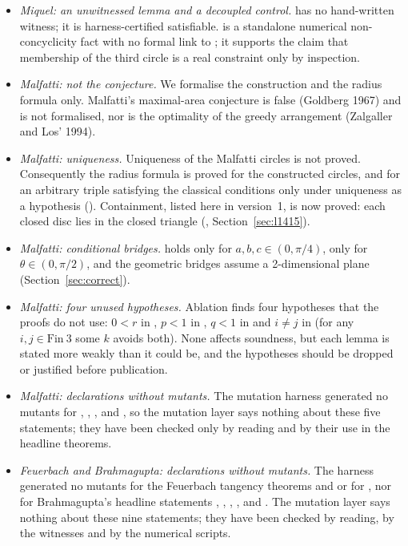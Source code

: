 \documentclass[11pt]{article}
\theoremstyle{definition}
\theoremstyle{remark}
\begin{document}
\begin{itemize}
\item \emph{Miquel: an unwitnessed lemma and a decoupled control.}  has no
hand-written witness; it is harness-certified satisfiable.  is a standalone numerical
non-concyclicity fact with no formal link to ; it supports the claim
that membership of the third circle is a real constraint only by inspection.
\item \emph{Malfatti: not the conjecture.} We formalise the construction and the radius formula
only. Malfatti's maximal-area conjecture is false (Goldberg 1967) and is not formalised, nor is the
optimality of the greedy arrangement (Zalgaller and Los' 1994).
\item \emph{Malfatti: uniqueness.} Uniqueness of the Malfatti circles is not proved. Consequently the
radius formula is proved for the constructed circles, and for an arbitrary triple satisfying the
classical conditions only under uniqueness as a hypothesis ().
Containment, listed here in version~1, is now proved: each closed disc lies in the closed triangle
(, Section~\ref{sec:l1415}).
\item \emph{Malfatti: conditional bridges.}  holds only for
$a,b,c\in(0,\pi/4)$,  only for $\theta\in(0,\pi/2)$, and the geometric
bridges assume a 2-dimensional plane (Section~\ref{sec:correct}).
\item \emph{Malfatti: four unused hypotheses.} Ablation finds four hypotheses that the proofs do not
use: $0<r$ in , $p<1$ in , $q<1$ in
 and $i\ne j$ in  (for any $i,j\in\mathrm{Fin}\ 3$
some $k$ avoids both). None affects soundness, but each lemma is stated more weakly than it could
be, and the hypotheses should be dropped or justified before publication.
\item \emph{Malfatti: declarations without mutants.} The mutation harness generated no mutants
for , ,
,  and
, so the mutation layer says nothing about these five statements; they
have been checked only by reading and by their use in the headline theorems.
\item \emph{Feuerbach and Brahmagupta: declarations without mutants.} The harness generated no
mutants for the Feuerbach tangency theorems 
and  or for
, nor for Brahmagupta's headline statements
, , ,
,  and
. The mutation layer says nothing about these nine
statements; they have been checked by reading, by the witnesses and by the numerical scripts.
\end{itemize}
\end{document}
